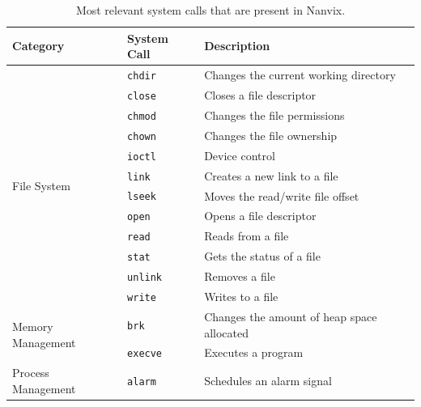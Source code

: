 \documentclass[10pt,a4paper]{article}
\begin{document}
\begin{table}[b]
\small
\centering
\caption{Most relevant system calls that are present in Nanvix.}
\label{table: most relevant system calls in nanvix}
\begin{tabular}{l l l}
	\toprule
	Category & System Call & Description \\
	\midrule
	\multirow{12}{*}{File System}        & \texttt{chdir}    & Changes the current working directory               \\%
	                                     & \texttt{close}    & Closes a file descriptor                            \\%
	                                     & \texttt{chmod}    & Changes the file permissions                        \\%
	                                     & \texttt{chown}    & Changes the file ownership                          \\%
	                                     & \texttt{ioctl}    & Device control                                      \\%
	                                     & \texttt{link}     & Creates a new link to a file                        \\%
	                                     & \texttt{lseek}    & Moves the read/write file offset                    \\%
	                                     & \texttt{open}     & Opens a file descriptor                             \\%
	                                     & \texttt{read}     & Reads from a file                                   \\%
	                                     & \texttt{stat}     & Gets the status of a file                           \\%
	                                     & \texttt{unlink}   & Removes a file                                      \\%
	                                     & \texttt{write}    & Writes to a file                                    \\%
	\midrule
	\multirow{2}{*}{Memory Management}   & \texttt{brk}      & Changes the amount of heap space allocated          \\
	                                     & \texttt{execve}   & Executes a program                                  \\
	\midrule
	\multirow{14}{*}{Process Management} & \texttt{alarm}    & Schedules an alarm signal                           \\

\end{tabular}
\end{table}
\end{document}
